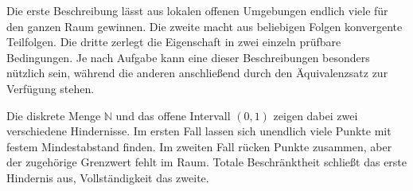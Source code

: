 Die erste Beschreibung lässt aus lokalen offenen Umgebungen
endlich viele für den ganzen Raum gewinnen. Die zweite macht
aus beliebigen Folgen konvergente Teilfolgen. Die dritte
zerlegt die Eigenschaft in zwei einzeln prüfbare Bedingungen.
Je nach Aufgabe kann eine dieser Beschreibungen besonders
nützlich sein, während die anderen anschließend durch den
Äquivalenzsatz zur Verfügung stehen.

Die diskrete Menge \(\mathbb N\) und das offene Intervall
\((0,1)\) zeigen dabei zwei verschiedene Hindernisse.
Im ersten Fall lassen sich unendlich viele Punkte mit festem
Mindestabstand finden. Im zweiten Fall rücken Punkte zusammen,
aber der zugehörige Grenzwert fehlt im Raum. Totale Beschränktheit
schließt das erste Hindernis aus, Vollständigkeit das zweite.
